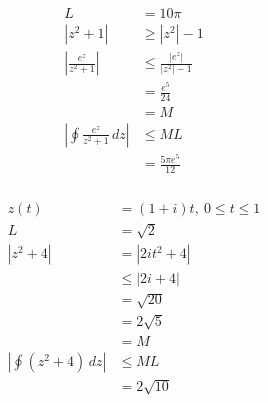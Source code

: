 \documentclass{article}
\begin{document}
\setcounter{subsubsection}{24}
\subsubsection{}

\begin{align*}
  L                                              & = 10 \pi                    \\
  |z^2 + 1|                                      & \ge |z^2| - 1               \\
  \left| \frac{e^z}{z^2 + 1} \right|             & \le \frac{|e^z|}{|z^2| - 1} \\
                                                 & = \frac{e^5}{24}            \\
                                                 & = M                         \\
  \left| \oint \frac{e^z}{z^2 + 1} \,d z \right| & \le M L                     \\
                                                 & = \frac{5 \pi e^5}{12}
\end{align*}

\setcounter{subsubsection}{26}
\subsubsection{}

\begin{align*}
  z(t)                                 & = (1 + i) t, \ 0 \le t \le 1 \\
  L                                    & = \sqrt{2}                   \\
  |z^2 + 4|                            & = |2 i t^2 + 4|              \\
                                       & \le |2 i + 4|                \\
                                       & = \sqrt{20}                  \\
                                       & = 2 \sqrt{5}                 \\
                                       & = M                          \\
  \left| \oint (z^2 + 4) \,d z \right| & \le M L                      \\
                                       & = 2 \sqrt{10}
\end{align*}

\setcounter{subsubsection}{32}
\subsubsection{}
\end{document}
